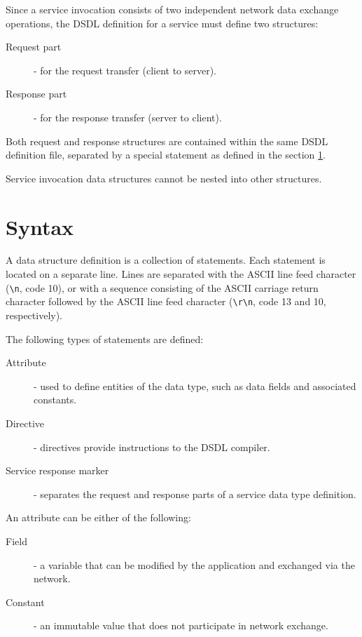 Since a service invocation consists of two independent network data exchange operations,
the DSDL definition for a service must define two structures:

\begin{description}
    \item[Request part] - for the request transfer (client to server).
    \item[Response part] - for the response transfer (server to client).
\end{description}

Both request and response structures are contained within the same DSDL definition file,
separated by a special statement as defined in the section \ref{sec:dsdl_syntax}.

Service invocation data structures cannot be nested into other structures.

\section{Syntax}\label{sec:dsdl_syntax}

A data structure definition is a collection of statements.
Each statement is located on a separate line.
Lines are separated with the ASCII line feed character (\verb|\n|, code 10),
or with a sequence consisting of the ASCII carriage return character followed by the ASCII line feed character
(\verb|\r\n|, code 13 and 10, respectively).

The following types of statements are defined:

\begin{description}
    \item[Attribute] - used to define entities of the data type, such as data fields and associated constants.
    \item[Directive] - directives provide instructions to the DSDL compiler.
    \item[Service response marker] - separates the request and response parts of a service data type definition.
\end{description}

An attribute can be either of the following:

\begin{description}
    \item[Field] - a variable that can be modified by the application and exchanged via the network.
    \item[Constant] - an immutable value that does not participate in network exchange.
\end{description}

